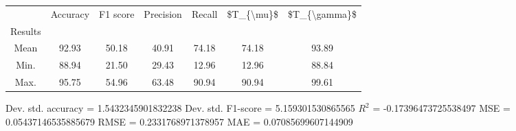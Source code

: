 \begin{tabular}{|c|c|c|c|c|c|c|}
\toprule
{} &  Accuracy &  F1 score &  Precision &  Recall &  \$T\_\{\textbackslash mu\}\$ &  \$T\_\{\textbackslash gamma\}\$ \\
Results &           &           &            &         &            &               \\
\hline
Mean    &     92.93 &     50.18 &      40.91 &   74.18 &      74.18 &         93.89 \\
Min.    &     88.94 &     21.50 &      29.43 &   12.96 &      12.96 &         88.84 \\
Max.    &     95.75 &     54.96 &      63.48 &   90.94 &      90.94 &         99.61 \\
\bottomrule
\end{tabular}

 Dev. std. accuracy = 1.5432345901832238
 Dev. std. F1-score = 5.159301530865565
 $R^2$ = -0.17396473725538497
 MSE = 0.05437146535885679
 RMSE = 0.2331768971378957
 MAE = 0.07085699607144909